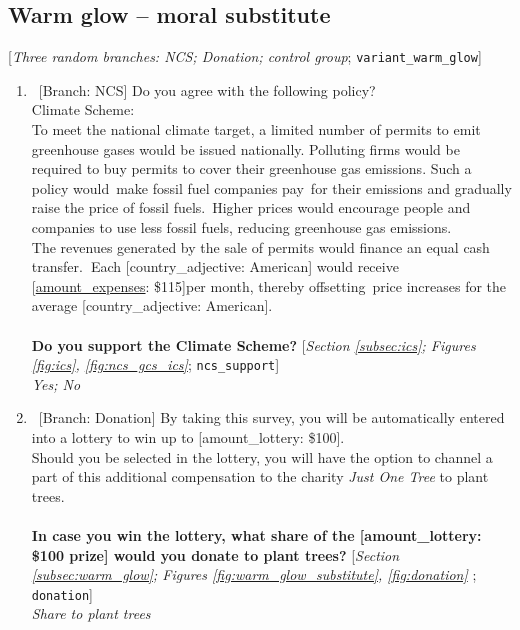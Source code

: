  \subsection*{Warm glow -- moral substitute} 
 [\textit{Three random branches: NCS; Donation; control group};  \verb|variant_warm_glow|] 
 \begin{enumerate}[resume] 
\item ~[Branch: NCS] \label{q:ncs_support} Do you agree with the following policy?
~\\
Climate Scheme:~\\
To meet the national climate target, a limited number of permits to emit greenhouse gases would be issued nationally. Polluting firms would be required to buy permits to cover their greenhouse gas emissions. Such a policy would~make fossil fuel companies pay~for their emissions and gradually raise the price of fossil fuels.~Higher prices would encourage people and companies to use less fossil fuels, reducing greenhouse gas emissions.\\
The revenues generated by the sale of permits would finance an equal cash transfer.\textbf{~}Each [country\_adjective: American] would receive [\hyperlink{tab_features}{amount\_expenses}: \$115]per month, thereby offsetting~price increases for the average [country\_adjective: American].\\ 
~\\
\textbf{Do you support the Climate Scheme?} [\textit{Section \ref{subsec:ics}; Figures \ref{fig:ics}, \ref{fig:ncs_gcs_ics}}; 
\verb|ncs_support|]
  \\ \textit{Yes; No}

\item ~[Branch: Donation] \label{q:donation} By taking this survey, you will be automatically entered into a lottery to win up to [amount\_lottery: \$100]. \\Should you be selected in the lottery, you will have the option to channel a part of this additional compensation to the charity \textit{Just One Tree} to plant trees.\\\\\textbf{In case you win the lottery, what share of the [amount\_lottery: \$100 prize] would you donate to plant trees?} [\textit{Section \ref{subsec:warm_glow}; Figures \ref{fig:warm_glow_substitute}, \ref{fig:donation}
}; 
\verb|donation|]
  \\ \textit{Share to plant trees}

\end{enumerate} 

